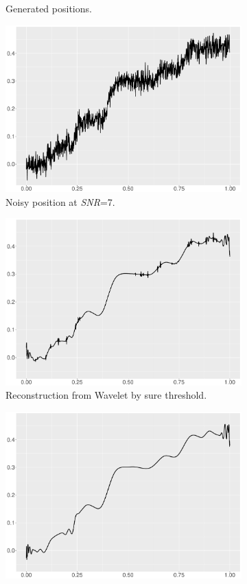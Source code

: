 \begin{figure}
\begin{subfigure}{0.45\textwidth}
    \caption{Generated positions.}
    \end{subfigure}
    \begin{subfigure}{0.45\textwidth}
    \centering
    \includegraphics[width=\linewidth,height=0.45\textwidth]{Chapters/02TractorSplineTheory/plot/ggplot/ggBumpsPositionNoise.pdf}
    \caption{Noisy position at \textit{SNR}=7.}
    \end{subfigure}
    \begin{subfigure}{0.45\textwidth}
    \centering
    \includegraphics[width=\linewidth,height=0.45\textwidth]{Chapters/02TractorSplineTheory/plot/ggplot/ggBumpsSure.pdf}
    \caption{Reconstruction from Wavelet by sure threshold.}
    \end{subfigure}
    \begin{subfigure}{0.45\textwidth}
    \centering
    \includegraphics[width=\linewidth,height=0.45\textwidth]{Chapters/02TractorSplineTheory/plot/ggplot/ggBumpsBayes.pdf}

\end{subfigure}
\end{figure}
